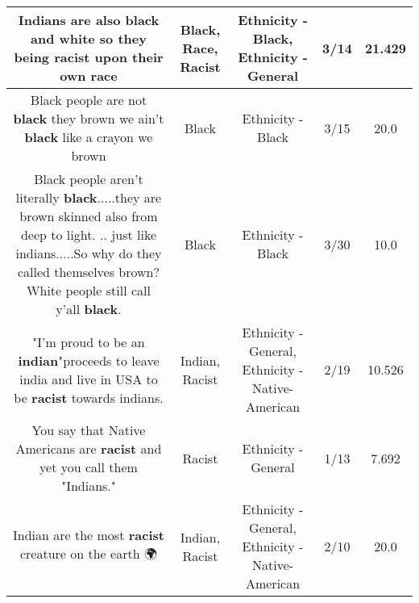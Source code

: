 \documentclass[11pt]{article}
\newlength\mylength
\begin{document}
\begin{center}
\begin{longtable}{|C{.65\mylength}|C{.30\mylength}|C{.12\mylength}|C{.12\mylength}|C{.12\mylength}|}
  \small Indians are also \textbf{black} and white so they being \textbf{racist} upon their own race\normalsize   & Black, Race, Racist & Ethnicity - Black, Ethnicity - General & 3/14 & 21.429 \\  \hline
  \small Black people are not \textbf{black} they brown we ain't \textbf{black} like a crayon we brown\normalsize   & Black & Ethnicity - Black & 3/15 & 20.0 \\  \hline
  \small Black people aren't literally \textbf{black}.....they are brown skinned also from deep to light. .. just like indians.....So why do they called themselves brown? White people still call y'all \textbf{black}.\normalsize   & Black & Ethnicity - Black & 3/30 & 10.0 \\  \hline
  \small "I'm proud to be an \textbf{indian}"proceeds to leave india and live in USA to be \textbf{racist} towards indians.\normalsize   & Indian, Racist & Ethnicity - General, Ethnicity - Native-American & 2/19 & 10.526 \\  \hline
  \small You say that Native Americans are \textbf{racist} and yet you call them "Indians."\normalsize   & Racist & Ethnicity - General & 1/13 & 7.692 \\  \hline
  \small Indian are the most \textbf{racist} creature on the earth 🌍\normalsize   & Indian, Racist & Ethnicity - General, Ethnicity - Native-American & 2/10 & 20.0 \\  \hline

\end{longtable}
\end{center}
\end{document}
